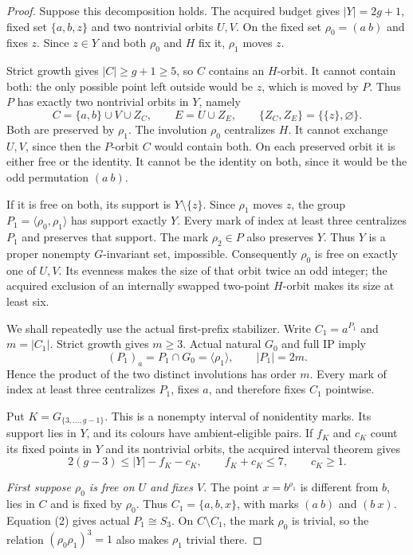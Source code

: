 \documentclass[11pt,a4paper]{article}
\newcommand{\gen}[1]{\langle#1\rangle}
\begin{document}
\begin{proof}
Suppose this decomposition holds. The acquired budget gives
$|Y|=2g+1$, fixed set $\{a,b,z\}$ and two nontrivial orbits
$U,V$. On the fixed set $\rho_0=(a\ b)$ and fixes $z$.
Since $z\in Y$ and both $\rho_0$ and $H$ fix it,
$\rho_1$ moves $z$.

Strict growth gives $|C|\ge g+1\ge5$, so $C$ contains an
$H$-orbit. It cannot contain both: the only possible point left
outside would be $z$, which is moved by $P$. Thus $P$ has exactly
two nontrivial orbits in $Y$, namely
\[
 C=\{a,b\}\cup V\cup Z_C,\qquad E=U\cup Z_E,\qquad
 \{Z_C,Z_E\}=\{\{z\},\varnothing\}.                 \tag{1}
\]
Both are preserved by $\rho_1$. The involution $\rho_0$
centralizes $H$. It cannot exchange $U,V$, since then the
$P$-orbit $C$ would contain both. On each preserved orbit it is
either free or the identity. It cannot be the identity on both,
since it would be the odd permutation $(a\ b)$.

If it is free on both, its support is $Y\setminus\{z\}$.
Since $\rho_1$ moves $z$, the group
$P_1=\gen{\rho_0,\rho_1}$ has support exactly $Y$.
Every mark of index at least three centralizes $P_1$ and preserves
that support. The mark $\rho_2\in P$ also preserves $Y$.
Thus $Y$ is a proper nonempty $G$-invariant set, impossible.
Consequently $\rho_0$ is free on exactly one of $U,V$.
Its evenness makes the size of that orbit twice an odd integer;
the acquired exclusion of an internally swapped two-point
$H$-orbit makes its size at least six.

We shall repeatedly use the actual first-prefix stabilizer.
Write $C_1=a^{P_1}$ and $m=|C_1|$. Strict growth gives $m\ge3$.
Actual natural $G_0$ and full IP imply
\[
 (P_1)_a=P_1\cap G_0=\gen{\rho_1},\qquad |P_1|=2m.       \tag{2}
\]
Hence the product of the two distinct involutions has order $m$.
Every mark of index at least three centralizes $P_1$, fixes $a$,
and therefore fixes $C_1$ pointwise.

Put $K=G_{\{3,\ldots,g-1\}}$. This is a nonempty interval of
nonidentity marks. Its support lies in $Y$, and its colours have
ambient-eligible pairs. If $f_K$ and $c_K$ count its fixed points
in $Y$ and its nontrivial orbits, the acquired interval theorem gives
\[
 2(g-3)\le |Y|-f_K-c_K,
 \qquad f_K+c_K\le7,\qquad c_K\ge1.                   \tag{3}
\]

\emph{First suppose $\rho_0$ is free on $U$ and fixes $V$.}
The point $x=b^{\rho_1}$ is different from $b$, lies in $C$
and is fixed by $\rho_0$. Thus $C_1=\{a,b,x\}$, with
marks $(a\ b)$ and $(b\ x)$. Equation (2) gives actual
$P_1\cong S_3$. On $C\setminus C_1$, the mark $\rho_0$
is trivial, so the relation $(\rho_0\rho_1)^3=1$ also makes
$\rho_1$ trivial there.


\end{proof}
\end{document}
